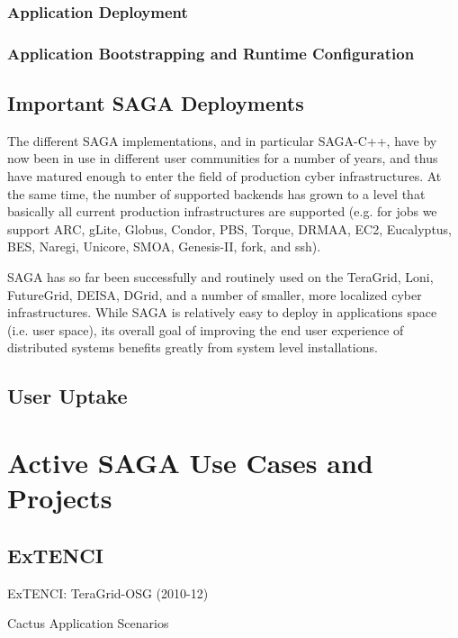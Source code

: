 \documentclass[3p,twocolumn]{article}
\begin{document}
  \subsubsection*{Application Deployment}


  \subsubsection*{Application Bootstrapping and Runtime Configuration}

   

 \subsection{Important SAGA Deployments}

  The different SAGA implementations, and in particular SAGA-C++, have
  by now been in use in different user communities for a number of
  years, and thus have matured enough to enter the  field of
  production cyber infrastructures.  At the same time, the number of
  supported backends has grown to a level that basically all current
  production infrastructures are supported (e.g. for jobs we support
  ARC, gLite, Globus, Condor, PBS, Torque, DRMAA, EC2, Eucalyptus,
  BES,  Naregi, Unicore, SMOA, Genesis-II, fork, and ssh).  

  SAGA has so far been successfully and routinely used on the
  TeraGrid, Loni, FutureGrid, DEISA, DGrid, and a number of smaller,
  more localized cyber infrastructures.  While SAGA is relatively easy
  to deploy in applications space (i.e. user space), its overall goal
  of improving the end user experience of distributed systems benefits
  greatly from system level installations.


 \subsection{User Uptake}

\section{Active SAGA Use Cases and Projects}

 \subsection{ExTENCI}

 ExTENCI: TeraGrid-OSG (2010-12)

 Cactus Application Scenarios
 
\end{document}
